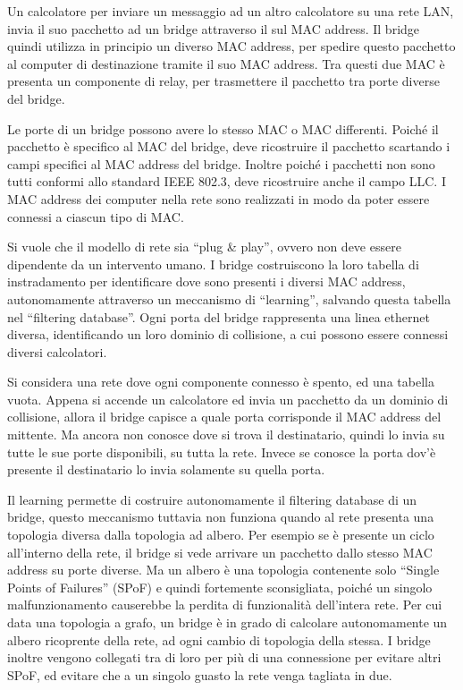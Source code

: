 \documentclass{article}
\numberwithin{equation}{subsection}
\begin{document}

Un calcolatore per inviare un messaggio ad un altro calcolatore su una rete LAN, invia il suo pacchetto ad un bridge attraverso il sul MAC address. Il bridge quindi 
utilizza in principio un diverso MAC address, per spedire questo pacchetto al computer di destinazione tramite il suo MAC address. Tra questi due MAC è presenta un 
componente di relay, per trasmettere il pacchetto tra porte diverse del bridge. 


Le porte di un bridge possono avere lo stesso MAC o MAC differenti. Poiché il pacchetto è specifico al MAC del bridge, deve ricostruire il pacchetto scartando i campi 
specifici al MAC address del bridge. Inoltre poiché i pacchetti non sono tutti conformi allo standard IEEE 802.3, deve ricostruire anche il campo LLC. I MAC address 
dei computer nella rete sono realizzati in modo da poter essere connessi a ciascun tipo di MAC. 


Si vuole che il modello di rete sia ``plug \& play'', ovvero non deve essere dipendente da un intervento umano. 
I bridge costruiscono la loro tabella di instradamento per identificare dove sono presenti i diversi MAC address, autonomamente attraverso un meccanismo di ``learning'', 
salvando questa tabella nel ``filtering database''. Ogni porta del bridge rappresenta una linea ethernet diversa, identificando un loro dominio di collisione, a cui 
possono essere connessi diversi calcolatori. 

Si considera una rete dove ogni componente connesso è spento, ed una tabella vuota. Appena si accende un calcolatore ed invia un pacchetto da un dominio di collisione, 
allora il bridge capisce a quale porta corrisponde il MAC address del mittente. Ma ancora non conosce dove si trova il destinatario, quindi lo invia su tutte le sue 
porte disponibili, su tutta la rete. Invece se conosce la porta dov'è presente il destinatario lo invia solamente su quella porta. 


Il learning permette di costruire autonomamente il filtering database di un bridge, questo meccanismo tuttavia non funziona quando al rete presenta una topologia diversa 
dalla topologia ad albero. Per esempio se è presente un ciclo all'interno della rete, il bridge si vede arrivare un pacchetto dallo stesso MAC address su porte diverse. 
Ma un albero è una topologia contenente solo ``Single Points of Failures'' (SPoF) e quindi fortemente sconsigliata, poiché un singolo malfunzionamento causerebbe la 
perdita di funzionalità dell'intera rete. Per cui data una topologia a grafo, un bridge è in grado di calcolare autonomamente un albero 
ricoprente della rete, ad ogni cambio di topologia della stessa. I bridge inoltre vengono collegati tra di loro per più di una connessione per evitare altri SPoF, ed 
evitare che a un singolo guasto la rete venga tagliata in due. 
\end{document}
